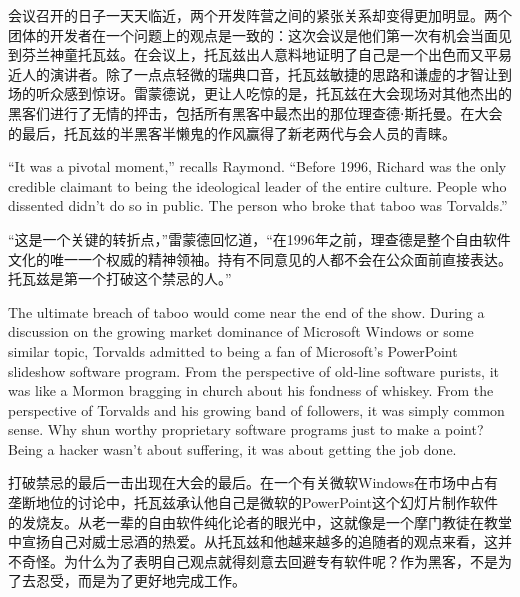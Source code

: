 \ifdefined\chs
会议召开的日子一天天临近，两个开发阵营之间的紧张关系却变得更加明显。两个团体的开发者在一个问题上的观点是一致的：这次会议是他们第一次有机会当面见到芬兰神童托瓦兹。在会议上，托瓦兹出人意料地证明了自己是一个出色而又平易近人的演讲者。除了一点点轻微的瑞典口音，托瓦兹敏捷的思路和谦虚的才智让到场的听众感到惊讶。雷蒙德说，更让人吃惊的是，托瓦兹在大会现场对其他杰出的黑客们进行了无情的抨击，包括所有黑客中最杰出的那位理查德⋅斯托曼。在大会的最后，托瓦兹的半黑客半懒鬼的作风赢得了新老两代与会人员的青睐。
\fi

\ifdefined\eng
``It was a pivotal moment,'' recalls Raymond. ``Before 1996, Richard was the only credible claimant to being the ideological leader of the entire culture. People who dissented didn't do so in public. The person who broke that taboo was Torvalds.''
\fi

\ifdefined\chs
``这是一个关键的转折点，''雷蒙德回忆道，``在1996年之前，理查德是整个自由软件文化的唯一一个权威的精神领袖。持有不同意见的人都不会在公众面前直接表达。托瓦兹是第一个打破这个禁忌的人。''
\fi

\ifdefined\eng
The ultimate breach of taboo would come near the end of the show. During a discussion on the growing market dominance of Microsoft Windows or some similar topic, Torvalds admitted to being a fan of Microsoft's PowerPoint slideshow software program. From the perspective of old-line software purists, it was like a Mormon bragging in church about his fondness of whiskey. From the perspective of Torvalds and his growing band of followers, it was simply common sense. Why shun worthy proprietary software programs just to make a point? Being a hacker wasn't about suffering, it was about getting the job done.
\fi

\ifdefined\chs
打破禁忌的最后一击出现在大会的最后。在一个有关微软Windows在市场中占有垄断地位的讨论中，托瓦兹承认他自己是微软的PowerPoint这个幻灯片制作软件的发烧友。从老一辈的自由软件纯化论者的眼光中，这就像是一个摩门教徒在教堂中宣扬自己对威士忌酒的热爱。从托瓦兹和他越来越多的追随者的观点来看，这并不奇怪。为什么为了表明自己观点就得刻意去回避专有软件呢？作为黑客，不是为了去忍受，而是为了更好地完成工作。
\fi

